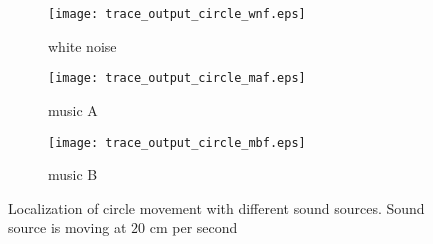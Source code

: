 \begin{figure*}[]
\centering
\begin{subfigure}[]{1.0\textwidth}
  \texttt{[image: trace\_output\_circle\_wnf.eps]}
  \caption{white noise}
  \label{fig:circle_wn}
\end{subfigure}
\begin{subfigure}[]{1.0\textwidth}
  \texttt{[image: trace\_output\_circle\_maf.eps]}
  \caption{music A}
  \label{fig:circle_musica}
\end{subfigure}
\begin{subfigure}[]{1.0\textwidth}
  \texttt{[image: trace\_output\_circle\_mbf.eps]}
  \caption{music B}
  \label{fig:circle_musicb}
\end{subfigure}
\caption{Localization of circle movement with different sound sources. Sound source is moving at $20$ cm per second}
\label{fig:circle_fast}
\end{figure*}
